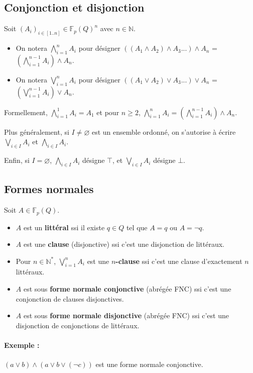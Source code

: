\documentclass{scrartcl}
\newcommand{\exemple}[1]{\paragraph{Exemple : } #1\\}
\newcommand{\fpq}{\mathbb{F}_p(Q)}
\newcommand{\definition}[1]{{\parindent0pt #1}}
\begin{document}
		\subsection{Conjonction et disjonction}
			Soit $(A_i)_{i\in [1..n]} \in \fpq^n$ avec $n\in\mathbb{N}$.
			\begin{itemize}
				\item On notera $\bigwedge\limits_{i=1}^n A_i$ pour désigner $((A_1\wedge A_2) \wedge A_3 ...) \wedge A_n$ = $(\bigwedge_{i=1}^{n-1} A_i) \wedge A_n$.
				\item On notera $\bigvee\limits_{i=1}^n A_i$ pour désigner $((A_1\vee A_2) \vee A_3 ...) \vee A_n$ = $(\bigvee_{i=1}^{n-1} A_i) \vee A_n$.
			\end{itemize}
			Formellement, $\bigwedge\limits_{i=1}^{1}A_i = A_1$ et pour $n \geq 2$, $\bigwedge\limits_{i=1}^n A_i = (\bigwedge_{i=1}^{n-1} A_i) \wedge A_n$. 

			\definition{Plus généralement, si $I \neq \varnothing$ est un ensemble ordonné, on s'autorise à écrire
			$\bigvee\limits_{i\in I} A_i$ et $\bigwedge\limits_{i\in I} A_i$.}

			\definition{Enfin, si $I = \varnothing$, $\bigwedge\limits_{i\in I} A_i$ désigne $\top$, et $\bigvee\limits_{i\in I} A_i$ désigne $\bot$.}

		\subsection{Formes normales}
			Soit $A \in \fpq$.

			\begin{itemize}
				\item $A$ est un \textbf{littéral} ssi il existe $q \in Q$ tel que $A = q$ ou $A = \neg q$.
				\item $A$ est une \textbf{clause} (disjonctive) ssi c'est une disjonction de littéraux.
				\item Pour $n \in \mathbb{N}^*$, $\bigvee_{i=1}^n A_i$ est une \textbf{$n$-clause} ssi c'est une clause d'exactement $n$ littéraux.
				\item $A$ est sous \textbf{forme normale conjonctive} (abrégée FNC) ssi c'est une conjonction de clauses disjonctives.
				\item $A$ est sous \textbf{forme normale disjonctive} (abrégée FNC) ssi c'est une disjonction de conjonctions de littéraux.
			\end{itemize}

			\exemple{$(a\vee b) \wedge (a \vee b \vee (\neg c))$ est une forme normale conjonctive.}
\end{document}

